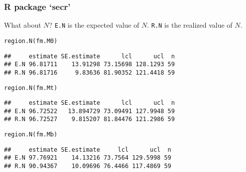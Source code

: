 \documentclass[color=usenames,dvipsnames]{beamer}\usepackage[]{graphicx}\usepackage[]{color}
\makeatletter
\newcommand{\hlstd}[1]{\textcolor[rgb]{0,0,0}{#1}}%
\newcommand{\hlkwd}[1]{\textcolor[rgb]{0.004,0.004,0.506}{#1}}%
\newenvironment{kframe}{%
 \def\at@end@of@kframe{}%
 \ifinner\ifhmode%
  \def\at@end@of@kframe{\end{minipage}}%
  \begin{minipage}{\columnwidth}%
 \fi\fi%
 \def\FrameCommand##1{\hskip\@totalleftmargin \hskip-\fboxsep
 \colorbox{shadecolor}{##1}\hskip-\fboxsep
     \hskip-\linewidth \hskip-\@totalleftmargin \hskip\columnwidth}%
 \MakeFramed {\advance\hsize-\width
   \@totalleftmargin\z@ \linewidth\hsize
   \@setminipage}}%
 {\par\unskip\endMakeFramed%
 \at@end@of@kframe}
\newenvironment{knitrout}{}{} %
\newcommand{\inr}[1]{\colorbox{inlinecolor}{\texttt{#1}}}
\makeatother
\begin{document}
\begin{frame}[fragile]
  \frametitle{R package `secr'}
  What about $N$? \pause \inr{E.N} is the expected value of
  $N$. \inr{R.N} is the realized value of $N$. 
  \vfill
\begin{knitrout}\footnotesize
{}\color{fgcolor}\begin{kframe}
\begin{alltt}
\hlkwd{region.N}\hlstd{(fm.M0)}
\end{alltt}
\begin{verbatim}
##     estimate SE.estimate      lcl      ucl  n
## E.N 96.81711    13.91298 73.15698 128.1293 59
## R.N 96.81716     9.83636 81.90352 121.4418 59
\end{verbatim}
\end{kframe}
\end{knitrout}
  \pause
\begin{knitrout}\footnotesize
{}\color{fgcolor}\begin{kframe}
\begin{alltt}
\hlkwd{region.N}\hlstd{(fm.Mt)}
\end{alltt}
\begin{verbatim}
##     estimate SE.estimate      lcl      ucl  n
## E.N 96.72522   13.894729 73.09491 127.9948 59
## R.N 96.72527    9.815207 81.84476 121.2986 59
\end{verbatim}
\end{kframe}
\end{knitrout}
  \pause
\begin{knitrout}\footnotesize
{}\color{fgcolor}\begin{kframe}
\begin{alltt}
\hlkwd{region.N}\hlstd{(fm.Mb)}
\end{alltt}
\begin{verbatim}
##     estimate SE.estimate     lcl      ucl  n
## E.N 97.76921    14.13216 73.7564 129.5998 59
## R.N 90.94367    10.09696 76.4466 117.4869 59
\end{verbatim}
\end{kframe}
\end{knitrout}
\end{frame}
\end{document}
